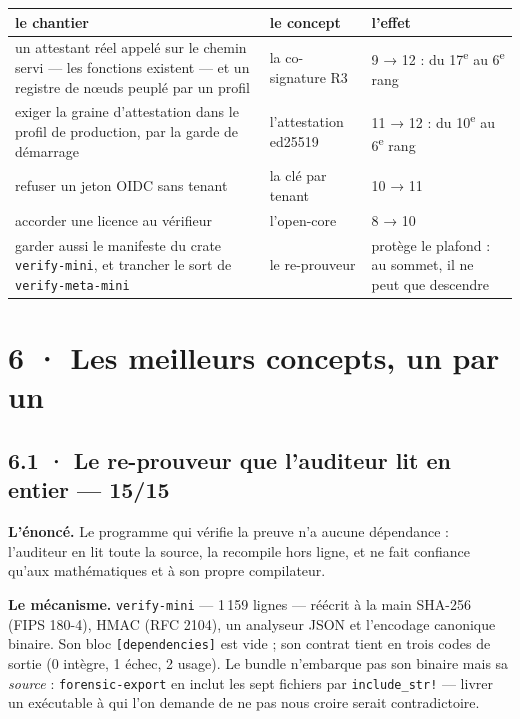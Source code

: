 \documentclass[10pt]{article}
\newcommand{\code}[1]{\texttt{\small #1}}
\begin{document}
{\small
\renewcommand{\arraystretch}{1.15}
\begin{longtable}{@{}L{7.9cm}L{4.3cm}L{4.8cm}@{}}
\toprule
\textbf{le chantier} & \textbf{le concept} & \textbf{l'effet} \\ \midrule \endhead
un attestant réel appelé sur le chemin servi --- les fonctions existent --- et un registre de nœuds peuplé par un profil & la co-signature R3 & 9 → 12 : du 17\textsuperscript{e} au 6\textsuperscript{e} rang \\
exiger la graine d'attestation dans le profil de production, par la garde de démarrage & l'attestation ed25519 & 11 → 12 : du 10\textsuperscript{e} au 6\textsuperscript{e} rang \\
refuser un jeton OIDC sans tenant & la clé par tenant & 10 → 11 \\
accorder une licence au vérifieur & l'open-core & 8 → 10 \\
garder aussi le manifeste du crate \code{verify-mini}, et trancher le sort de \code{verify-meta-mini} & le re-prouveur & protège le plafond : au sommet, il ne peut que descendre \\
\bottomrule
\end{longtable}
}

\section{6 · Les meilleurs concepts, un par un}

\subsection{6.1 · Le re-prouveur que l'auditeur lit en entier --- 15/15}

\begin{these}
\textbf{L'énoncé.} Le programme qui vérifie la preuve n'a aucune dépendance : l'auditeur en lit toute la source, la
recompile hors ligne, et ne fait confiance qu'aux mathématiques et à son propre compilateur.
\end{these}

\textbf{Le mécanisme.} \code{verify-mini} --- 1\,159 lignes --- réécrit à la main SHA-256 (FIPS 180-4), HMAC
(RFC 2104), un analyseur JSON et l'encodage canonique binaire. Son bloc \code{[dependencies]} est vide ; son contrat
tient en trois codes de sortie (0 intègre, 1 échec, 2 usage). Le bundle n'embarque pas son binaire mais sa
\emph{source} : \code{forensic-export} en inclut les sept fichiers par \code{include\_str!} --- livrer un exécutable à
qui l'on demande de ne pas nous croire serait contradictoire.
\end{document}
